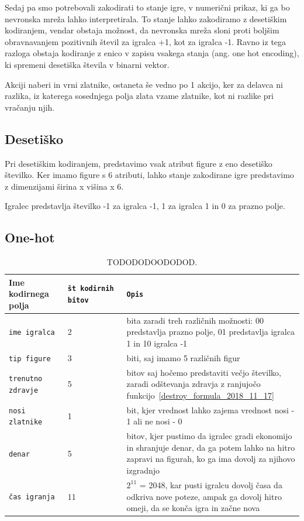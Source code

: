 \documentclass[a4paper, 12pt]{book}
\begin{document}
Sedaj pa smo potrebovali zakodirati to stanje igre, v numerični prikaz, ki ga bo nevronska mreža lahko interpretirala. 
To stanje lahko zakodiramo z desetiškim kodiranjem, vendar obstaja možnost, da nevronska mreža sloni proti boljšim obravnavanjem pozitivnih števil za igralca +1, kot za igralca -1. 
Ravno iz tega razloga obstaja kodiranje z enico v zapisu vsakega stanja (ang. one hot encoding), ki spremeni desetiška števila v binarni vektor.

Akciji naberi in vrni zlatnike, ostaneta še vedno po 1 akcijo, ker za delavca ni razlika, iz katerega sosednjega polja zlata vzame zlatnike, kot ni razlike pri vračanju njih.

\subsection{Desetiško}
Pri desetiškim kodiranjem, predstavimo vsak atribut figure z eno desetiško številko.
Ker imamo figure s 6 atributi, lahko stanje zakodirane igre predstavimo z dimenzijami širina x višina x 6.

Igralec predstavlja številko -1 za igralca -1, 1 za igralca 1 in 0 za prazno polje.
\subsection{One-hot}

\begin{table}
	\begin{center}
		\begin{tabular}{p{0.2\linewidth}|p{0.2\linewidth}|p{0.6\linewidth}}
			Ime kodirnega polja      & {\tt št kodirnih bitov} & {\tt Opis} \\ \hline
			{\tt ime igralca}        & 2                       & bita zaradi treh različnih možnosti: 00 predstavlja prazno polje, 01 predstavlja igralca 1 in 10 igralca -1 \\
			{\tt tip figure}         & 3                       & biti, saj imamo 5 različnih figur\\
			{\tt trenutno zdravje}   & 5                       & bitov saj hočemo predstaviti večjo številko, zaradi odštevanja zdravja z ranjujočo funkcijo~\ref{destroy_formula_2018_11_17} \\
			{\tt nosi zlatnike}      & 1                       & bit, kjer vrednost lahko zajema vrednost nosi - 1 ali ne nosi - 0 \\
			{\tt denar}              & 5                       & bitov, kjer pustimo da igralec gradi ekonomijo in shranjuje denar, da ga potem lahko na hitro zapravi na figurah, ko ga ima dovolj za njihovo izgradnjo \\
			{\tt čas igranja}        & 11                      & $2^{11}$ = 2048, kar pusti igralcu dovolj časa da odkriva nove poteze, ampak ga dovolj hitro omeji, da se konča igra in začne nova \\
		\end{tabular}
	\end{center}
	\caption{TODODODOODODOD.}
	\label{tableEncodersOneHot}
\end{table}
\end{document}
